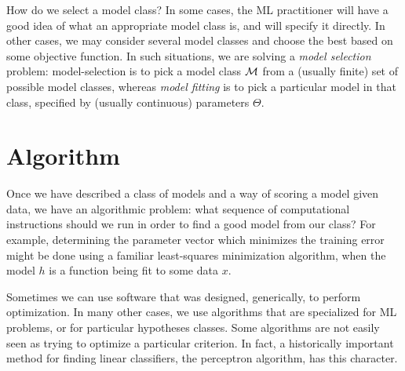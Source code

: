 How do we select a model class?  In some cases, the ML
practitioner will have a good idea of what an appropriate model class
is, and will specify it directly.  In other cases, we may consider
several model classes and choose the best based on some objective function.  In such situations, we are solving a {\em
    model selection} problem: model-selection is to pick a model class
${\cal M}$ from a (usually finite) set of possible model classes, whereas {\em
    model fitting} is to pick a particular model in that class,
specified by (usually continuous) parameters $\Theta$.

\section{Algorithm}
Once we have described a class of models and a way of scoring a model
given data, we have an algorithmic problem: what sequence of
computational instructions should we run in order to find a good model
from our class?  For example, determining the parameter vector which minimizes the training error might be done using a
familiar least-squares minimization algorithm, when the model $h$ is a
function being fit to some data $x$.

Sometimes we can use software that was designed, generically, to
perform optimization.  In many other cases, we use algorithms that are
specialized for ML problems, or for particular
hypotheses classes.
Some algorithms are not easily seen as trying to optimize a particular
criterion.  In fact, a historically important method for finding linear
classifiers, the perceptron algorithm, has this character.


